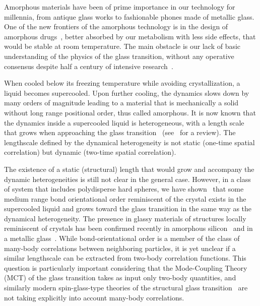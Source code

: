 \documentclass[twocolumn,superscriptaddress]{revtex4}
\begin{document}
Amorphous materials have been of prime importance in our technology for millennia, from antique glass works to fashionable phones made of metallic glass. One of the new frontiers of the amorphous technology is in the design of amorphous drugs~\cite{Petit2006,Grzybowska2012}, better absorbed by our metabolism with less side effects, that would be stable at room temperature. The main obstacle is our lack of basic understanding of the physics of the glass transition, without any operative consensus despite half a century of intensive research~\citep{cavagna2009supercooled,BerthierR}.

When cooled below its freezing temperature while avoiding crystallization, a liquid becomes supercooled. Upon further cooling, the dynamics slows down by many orders of magnitude leading to a material that is mechanically a solid without long range positional order, thus called amorphous. It is now known that the dynamics inside a supercooled liquid is heterogeneous, with a length scale that grows when approaching the glass transition~\citep{yamamoto1998,Donati1999a} (see~\citep{BerthierR} for a review). The lengthscale defined by the dynamical heterogeneity is not static (one-time spatial correlation) but dynamic (two-time spatial correlation).

The existence of a static (structural) length that would grow and accompany the dynamic heterogeneities is still not clear in the general case. However, in a class of system that includes polydisperse hard spheres, we have shown~\cite{tanaka} that some medium range bond orientational order reminiscent of the crystal exists in the supercooled liquid and grows toward the glass transition in the same way as the dynamical heterogeneity. The presence in glassy materials of structures locally reminiscent of crystals has been confirmed recently in amorphous silicon~\cite{Treacy2012} and in a metallic glass~\cite{Hwang2012}. While bond-orientational order is a member of the class of many-body
correlations between neighboring particles, it is yet unclear if a similar lengthscale can be extracted
from two-body correlation functions.
This question is particularly important considering that the Mode-Coupling Theory (MCT) of the glass transition takes as input only two-body quantities, and
similarly modern spin-glass-type theories of the structural glass transition~\cite{lubchenko2007,Biroli2008,Parisi2010} are not taking explicitly into account many-body correlations.
\end{document}
